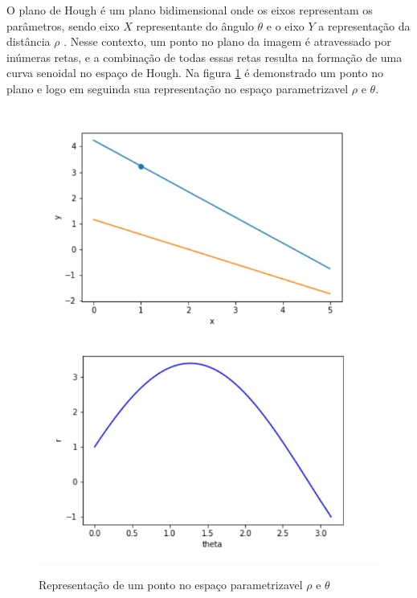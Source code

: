 O plano de Hough é um plano bidimensional onde os eixos representam os parâmetros, sendo eixo $X$ representante do ângulo $\theta$ e o eixo $Y$ a representação da distância $\rho$ \cite{transformadaHough1}. Nesse contexto, um ponto no plano da imagem é atravessado por inúmeras retas, e a combinação de todas essas retas resulta na formação de uma curva senoidal no espaço de Hough\cite{detectBar}. Na figura \ref{fig:Representacao de um ponto no espaco parametrizavel} é demonstrado um ponto no plano e logo em seguinda sua representação no espaço parametrizavel $\rho$ e $\theta$.


\begin{figure}[!htb]
	\centering
    \caption{Representação de um ponto no espaço parametrizavel $\rho$ e $\theta$}
	\includegraphics[scale=0.5]{figuras/math/pontoEspacoParametrizavel.png}
	\label{fig:Representacao de um ponto no espaco parametrizavel}
\end{figure}

